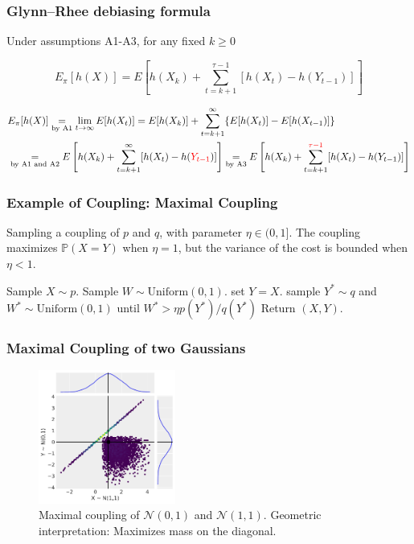 \documentclass[aspectratio=169]{beamer}
\begin{document}
\begin{frame}
\frametitle{Glynn--Rhee debiasing formula}
\begin{theorem}
  Under assumptions A1-A3, for any fixed $k \geq 0$

\[
E_\pi[h(X)]  =E[h(X_k) + \sum_{t=k+1}^{\tau-1} [h(X_t) - h(Y_{t-1})] ] 
\]  
\end{theorem}

\begin{align*}
&E_\pi[h(X)] \underset{\text{by A1}}{=} \lim_{t \to \infty} E[h(X_t)] = E[h(X_k)] + \sum_{t=k+1}^{\infty} \{E[h(X_t)] - E[h(X_{t-1})]\} \\
&\underset{\text{by A1 and A2}}{=} E\left[h(X_k) + \sum_{t=k+1}^{\infty} [h(X_t) - h(\textcolor{red}{Y_{t-1}})]\right] 
\underset{\text{by A3}}{=} E\left[h(X_k) + \sum_{t=k+1}^{\textcolor{red}{\tau-1}} [h(X_t) - h(Y_{t-1})]\right]
\end{align*}

\end{frame}

\begin{frame}
\frametitle{Example of Coupling: Maximal Coupling}
\begin{algorithm}[H]
\caption{Sampling a coupling of $p$ and $q$, with parameter $\eta \in (0, 1]$. The coupling maximizes $\mathbb{P}(X = Y)$ when $\eta = 1$, but the variance of the cost is bounded when $\eta < 1$.}
\begin{algorithmic}[1]
\STATE Sample $X \sim p$.
\STATE Sample $W \sim \text{Uniform}(0, 1)$.
  \STATE set $Y = X$.
\ELSE
    \STATE sample $Y^* \sim q$ and $W^* \sim \text{Uniform}(0, 1)$ until $W^* > \eta p(Y^*)/q(Y^*)$
  \ENDWHILE
\ENDIF
\STATE Return $(X, Y)$.
\end{algorithmic}
\end{algorithm}
\end{frame}

\begin{frame}
\frametitle{Maximal Coupling of two Gaussians}
\begin{figure}[h]
    \centering
    \includegraphics[width=0.4\textwidth]{maximal_coupling_plot.pdf}
    \caption{Maximal coupling of $\mathcal{N}(0, 1)$ and $\mathcal{N}(1, 1)$. Geometric interpretation: Maximizes mass on the diagonal.}
\end{figure}
\end{frame}
\end{document}
